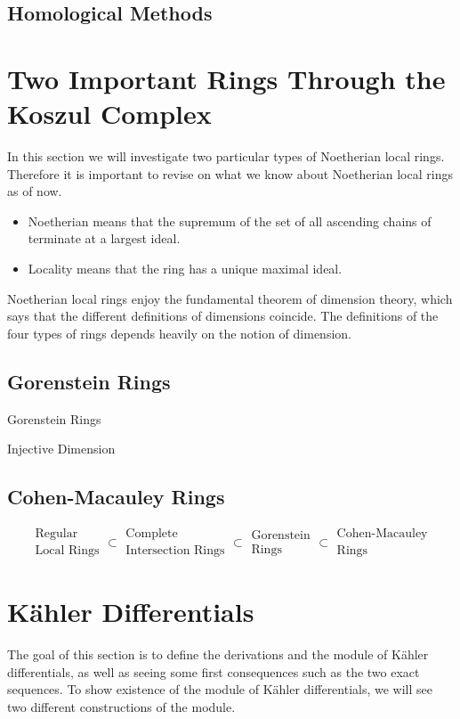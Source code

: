 \documentclass[a4paper]{article}
\begin{document}
\subsection{Homological Methods}

\pagebreak
\section{Two Important Rings Through the Koszul Complex}
In this section we will investigate two particular types of Noetherian local rings. Therefore it is important to revise on what we know about Noetherian local rings as of now. 
\begin{itemize}
\item Noetherian means that the supremum of the set of all ascending chains of terminate at a largest ideal. 
\item Locality means that the ring has a unique maximal ideal. 
\end{itemize}
Noetherian local rings enjoy the fundamental theorem of dimension theory, which says that the different definitions of dimensions coincide. The definitions of the four types of rings depends heavily on the notion of dimension. 

\subsection{Gorenstein Rings}
\begin{defn}{Gorenstein Rings}{}
\end{defn}

\begin{defn}{Injective Dimension}{}
\end{defn}

\subsection{Cohen-Macauley Rings}

$$\substack{\text{Regular}\\\text{Local Rings}}\subset\substack{\text{Complete}\\\text{Intersection Rings}}\subset\substack{\text{Gorenstein}\\\text{Rings}}\subset\substack{\text{Cohen-Macauley}\\\text{Rings}}$$

\pagebreak
\section{Kähler Differentials}
The goal of this section is to define the derivations and the module of Kähler differentials, as well as seeing some first consequences such as the two exact sequences. To show existence of the module of Kähler differentials, we will see two different constructions of the module. 
\end{document}
